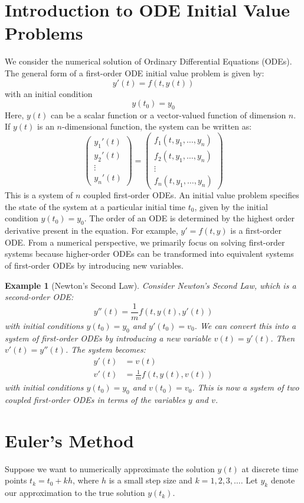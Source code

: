 \documentclass{article}
\newtheorem{example}{Example}
\newtheorem{example}{Example}
\begin{document}
\sloppy
\section{Introduction to ODE Initial Value Problems}
We consider the numerical solution of Ordinary Differential Equations (ODEs). The general form of a first-order ODE initial value problem is given by:
\[ y'(t) = f(t, y(t)) \]
with an initial condition
\[ y(t_0) = y_0 \]
Here, $y(t)$ can be a scalar function or a vector-valued function of dimension $n$. If $y(t)$ is an $n$-dimensional function, the system can be written as:
\[
\begin{pmatrix} y_1'(t) \\ y_2'(t) \\ \vdots \\ y_n'(t) \end{pmatrix}
=
\begin{pmatrix} f_1(t, y_1, \dots, y_n) \\ f_2(t, y_1, \dots, y_n) \\ \vdots \\ f_n(t, y_1, \dots, y_n) \end{pmatrix}
\]
This is a system of $n$ coupled first-order ODEs. An initial value problem specifies the state of the system at a particular initial time $t_0$, given by the initial condition $y(t_0) = y_0$.
The order of an ODE is determined by the highest order derivative present in the equation. For example, $y' = f(t, y)$ is a first-order ODE. From a numerical perspective, we primarily focus on solving first-order systems because higher-order ODEs can be transformed into equivalent systems of first-order ODEs by introducing new variables.
\begin{example}[Newton's Second Law]
Consider Newton's Second Law, which is a second-order ODE:
\[ y''(t) = \frac{1}{m} f(t, y(t), y'(t)) \]
with initial conditions $y(t_0) = y_0$ and $y'(t_0) = v_0$.
We can convert this into a system of first-order ODEs by introducing a new variable $v(t) = y'(t)$. Then $v'(t) = y''(t)$. The system becomes:
\begin{align*} y'(t) &= v(t) \\ v'(t) &= \frac{1}{m} f(t, y(t), v(t)) \end{align*}
with initial conditions $y(t_0) = y_0$ and $v(t_0) = v_0$. This is now a system of two coupled first-order ODEs in terms of the variables $y$ and $v$.
\end{example}
\section{Euler's Method}
Suppose we want to numerically approximate the solution $y(t)$ at discrete time points $t_k = t_0 + k h$, where $h$ is a small step size and $k = 1, 2, 3, \dots$. Let $y_k$ denote our approximation to the true solution $y(t_k)$.
\end{document}

